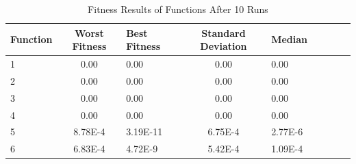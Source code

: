 \begin{table}[h!]
\centering
\begin{tabular}{l c l c l c l c l}
\hline
 Function & Worst Fitness       & Best Fitness        & Standard Deviation          & Median        \\
\hline
1   & 0.00 & 0.00 & 0.00 & 0.00 \\
\hline
2   & 0.00 & 0.00 & 0.00 & 0.00 \\
\hline
3  & 0.00 & 0.00 & 0.00 & 0.00 \\
\hline
4  & 0.00 & 0.00 & 0.00 & 0.00 \\
\hline
5  & 8.78E-4 & 3.19E-11 & 6.75E-4 & 2.77E-6 \\
\hline
6  & 6.83E-4 & 4.72E-9 & 5.42E-4 & 1.09E-4 \\
\hline
\end{tabular}
\caption{Fitness Results of Functions After 10 Runs}
\end{table}


